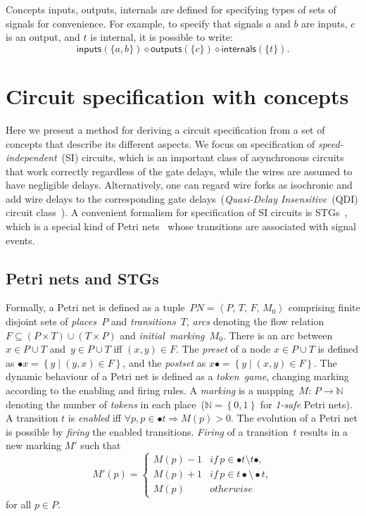 \documentclass[british,compsoc]{IEEEtran}
\begin{document}
Concepts \textsf{inputs}, \textsf{outputs}, \textsf{internals} are defined for
specifying types of sets of signals for convenience. For example, to specify
that signals $a$ and $b$ are inputs, $c$ is an output, and $t$ is internal, it
is possible to write:
\[
\mathsf{inputs}(\{a, b\}) \diamond \mathsf{outputs}(\{c\}) \diamond \mathsf{internals}(\{t\}).
\]

\section{Circuit specification with concepts \label{sec:Circuit-specification-with}}


Here we present a method for deriving a circuit specification
from a set of concepts that describe its different aspects. We focus
on specification of \emph{speed-independent}~(SI) circuits, which
is an important class of asynchronous circuits~\cite{Muller_1959_ts}
that work correctly regardless of the gate delays, while the wires
are assumed to have negligible delays. Alternatively, one can regard
wire forks as isochronic and add wire delays to the corresponding
gate delays~(\emph{Quasi-Delay Insensitive}~(QDI) circuit class~\cite{Martin_1986_dc}).
A convenient formalism for specification of SI circuits is
STGs~\cite{Chu_1987_phd}\cite{Rosenblum_1985_tpn},
which is a special kind of Petri nets~\cite{Petri_1962_phd} whose
transitions are associated with signal events.

\subsection{Petri nets and STGs}

Formally, a Petri net is defined as a tuple~$PN=\left\langle P,\, T,\, F,\, M_{0}\right\rangle $
comprising finite disjoint sets of \emph{places~}$P$ and \emph{transitions~}$T$,
\emph{arcs} denoting the flow relation~$F\subseteq\left(P\times T\right)\cup\left(T\times P\right)$
and \emph{initial~marking~}$M_{0}$. There is an arc between~$x\in P\cup T$
and~$y\in P\cup T$ iff $\left(x,y\right)\in F$. The \emph{preset}
of a node $x\in P\cup T$ is defined as $\bullet x=\left\{ y\mid\left(y,x\right)\in F\right\} $,
and the \emph{postset} as $x\bullet=\left\{ y\mid\left(x,y\right)\in F\right\} $.
The dynamic behaviour of a Petri net is defined as a \emph{token~game},
changing marking according to the enabling and firing rules. A \emph{marking}
is a mapping~$M:\, P\rightarrow\mathbb{N}$ denoting the number of
\emph{tokens} in each place~($\mathbb{N}=\left\{ 0,1\right\} $ for
\emph{1-safe} Petri nets). A transition $t$ is \emph{enabled} iff
$\forall p,p\in\bullet t\Rightarrow M(p)>0$. The evolution of a Petri
net is possible by \emph{firing} the enabled transitions. \emph{Firing}
of a transition~$t$ results in a new marking $M'$ such that
\[
M'\left(p\right)=\left\{ \begin{array}{cc}
M(p)-1 & if\, p\in\bullet t\setminus t\bullet,\\
M(p)+1 & if\, p\in t\bullet\setminus\bullet t,\\
M(p)\,\,\,\,\, & otherwise
\end{array}\right.
\]
 for all $p\in P$.
\end{document}
